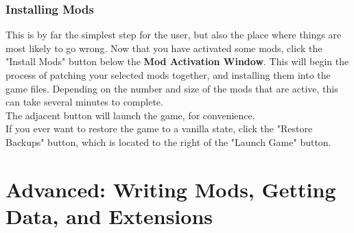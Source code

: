 \documentclass{article}
\begin{document}
\subsubsection{Installing Mods}
This is by far the simplest step for the user, but also the place where things are most likely to go wrong. Now that you have activated some mods, click the "Install Mods" button below the \textbf{Mod Activation Window}. This will begin the process of patching your selected mods together, and installing them into the game files. Depending on the number and size of the mods that are active, this can take several minutes to complete.\\
The adjacent button will launch the game, for convenience.\\
If you ever want to restore the game to a vanilla state, click the "Restore Backups" button, which is located to the right of the "Launch Game" button.
\newpage

\section{Advanced: Writing Mods, Getting Data, and Extensions}
\end{document}
